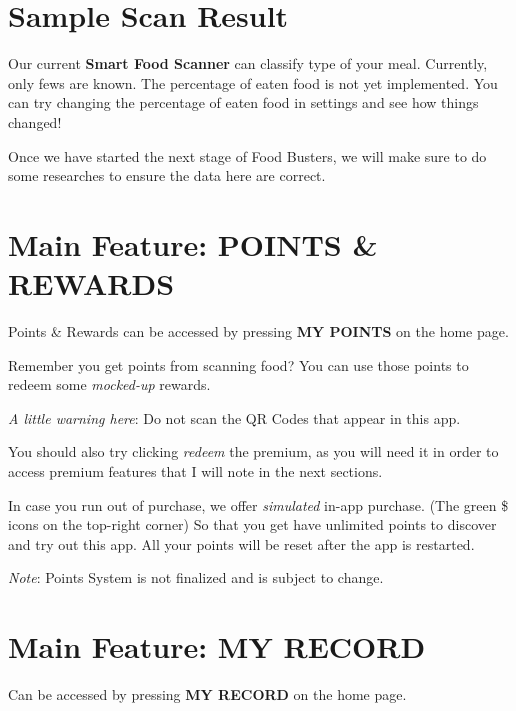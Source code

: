 \documentclass[a4paper,12pt]{article}
\begin{document}
\pagebreak
\section*{Sample Scan Result}


Our current \textbf{Smart Food Scanner} can classify type of your meal.
Currently, only fews are known. The percentage of eaten food is not yet implemented.
You can try changing the percentage of eaten food in settings and see how things changed!

Once we have started the next stage of Food Busters, we will make sure to do
some researches to ensure the data here are correct.

\pagebreak
\section{Main Feature: POINTS \& REWARDS}

Points \& Rewards can be accessed by pressing \textbf{MY POINTS} on the home page.


Remember you get points from scanning food? You can use those points to redeem
some \textit{mocked-up} rewards.

\textit{A little warning here}: Do not scan the QR Codes that appear in this app.

You should also try clicking \textit{redeem} the premium, as you will need it
in order to access premium features that I will note in the next sections.

In case you run out of purchase, we offer \textit{simulated} in-app purchase.
(The green \$ icons on the top-right corner) So that you get have unlimited points
to discover and try out this app. All your points will be reset after the app is restarted.

\textit{Note}: Points System is not finalized and is subject to change.

\pagebreak
\section{Main Feature: MY RECORD}

Can be accessed by pressing \textbf{MY RECORD} on the home page.
\end{document}
